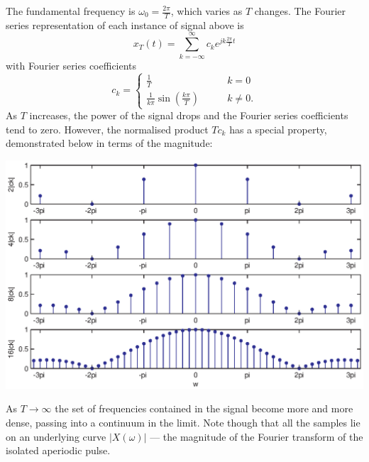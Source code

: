 \documentclass[10pt]{beamer}
\begin{document}
The fundamental frequency is $\omega_0 = \frac{2 \pi}{T}$, which varies as $T$ changes.  The Fourier series representation of each instance of signal above is
\begin{equation*}
  x_T(t) = \sum_{k=-\infty}^{\infty} c_k e^{j k \frac{2 \pi}{T} t}
\end{equation*}
with Fourier series coefficients
\begin{equation*}
  c_k =  \begin{cases}
    \frac{1}{T} \qquad & k = 0 \\
    \frac{1}{k \pi} \sin \left( \frac{k \pi}{T} \right) \qquad & k \neq 0.
  \end{cases}  
\end{equation*}
As $T$ increases, the power of the signal drops and the Fourier series coefficients tend to zero.  However, the normalised product $T c_k$ has a special property, demonstrated below in terms of the magnitude:
\begin{center}
  \includegraphics{fs2ft2}
\end{center}
As $T \to \infty$ the set of frequencies contained in the signal become more and more dense, passing into a continuum in the limit.  Note though that all the samples lie on an underlying curve $|X(\omega)|$ --- the magnitude of the Fourier transform of the isolated aperiodic pulse.
\end{document}
